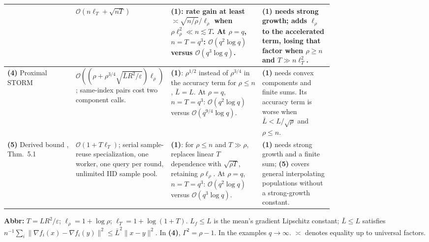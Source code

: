 \begin{table}[tp]
\begin{threeparttable}
\begin{tabularx}{\linewidth}{@{}>{\raggedright\arraybackslash}p{0.21\linewidth}>{\raggedright\arraybackslash}p{0.28\linewidth}>{\raggedright\arraybackslash}p{0.28\linewidth}>{\raggedright\arraybackslash}X@{}}
& $\mathcal{O}\!\left(n\ell_T+\sqrt{nT}\right)$
& \textbf{(1)}: rate gain at least $\asymp\sqrt{n/\rho}/\ell_\rho$ when $\rho\ell_\rho^2\ll n\lesssim T$. At $\rho=q$, $n=T=q^3$: $\mathcal{O}(q^2\log q)$ versus $\mathcal{O}(q^3\log q)$.
& \textbf{(1)} needs strong growth; adds $\ell_\rho$ to the accelerated term, losing that factor when $\rho\ge n$ and $T\gg n\ell_T^2$. \\
\midrule
\textbf{(4)} Proximal STORM \citep{fsgcProximalStorm2026}
& $\mathcal{O}\!\left((\rho+\rho^{3/4}\sqrt{\bar L R^2/\varepsilon})\ell_\rho\right)$; same-index pairs cost two component calls.
& \textbf{(1)}: $\rho^{1/2}$ instead of $\rho^{3/4}$ in the accuracy term for $\rho\le n$, $\bar L=L$. At $\rho=q$, $n=T=q^3$: $\mathcal{O}(q^2\log q)$ versus $\mathcal{O}(q^{9/4}\log q)$.
& \textbf{(1)} needs convex components and finite sums. Its accuracy term is worse when $\bar L<L/\sqrt\rho$ and $\rho\le n$. \\
\midrule
\textbf{(5)} Derived bound \citep{fsgcNovoselov2026v1}, Thm.~5.1
& $\mathcal{O}(1+T\ell_T)$; serial sample-reuse specialization, one worker, one query per round, unlimited IID sample pool.
& \textbf{(1)}: for $\rho\le n$ and $T\gg\rho$, replaces linear $T$ dependence with $\sqrt{\rho T}$, retaining $\rho\ell_\rho$. At $\rho=q$, $n=T=q^3$: $\mathcal{O}(q^2\log q)$ versus $\mathcal{O}(q^3\log q)$.
& \textbf{(1)} needs strong growth and a finite sum; \textbf{(5)} covers general interpolating populations without a strong-growth constant. \\
\bottomrule
\end{tabularx}
\begin{tablenotes}[flushleft]\footnotesize
\item[] \textbf{Abbr:} $T=LR^2/\varepsilon$; $\ell_\rho=1+\log\rho$; $\ell_T=1+\log(1+T)$. $L_f\le L$ is the mean's gradient Lipschitz constant; $\bar L\le L$ satisfies $n^{-1}\sum_i\|\nabla f_i(x)-\nabla f_i(y)\|^2\le\bar L^2\|x-y\|^2$. In \textbf{(4)}, $\Gamma^2=\rho-1$. In the examples $q\to\infty$. $\asymp$ denotes equality up to universal factors.
\end{tablenotes}
\end{threeparttable}
\end{table}
\clearpage
